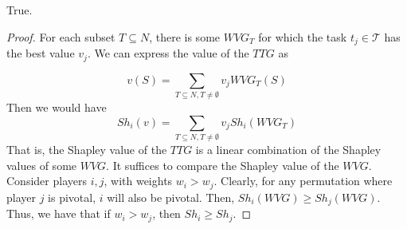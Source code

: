 \subsection{}
True.\\
\begin{proof}
    For each subset $T\subseteq N$, there is some $WVG_T$ for which
    the task $t_j\in\mathcal{T}$ has the best value $v_j$.
    We can express the value of the $TTG$ as

    \[v(S) = \sum_{T\subseteq N, T\neq\emptyset} v_j WVG_{T}(S) \]
    Then we would have 
    \[Sh_i(v)=\sum_{T\subseteq N, T\neq\emptyset} v_j Sh_i(WVG_{T})\]
    That is, the Shapley value of the $TTG$ is a linear combination
    of the Shapley values of some $WVG$.
    It suffices to compare the Shapley value of the $WVG$.\\
    Consider players $i,j$, with weights $w_i>w_j$.
    Clearly, for any permutation where player $j$ is pivotal,
    $i$ will also be pivotal. Then, $Sh_i(WVG) \geq Sh_j(WVG)$.
    Thus, we have that if $w_i>w_j$, then $Sh_i\geq Sh_j$.
\end{proof}


